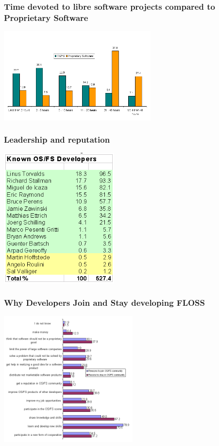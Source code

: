 \documentclass{beamer}
\begin{document}
\begin{frame}
\frametitle{Time devoted to libre software projects compared to Proprietary Software}

\begin{center}
\includegraphics[width=8cm]{figs/TimeOSvsPS.png}
\end{center}

\end{frame}


\begin{frame}
\frametitle{Leadership and reputation}

\begin{center}
\includegraphics[width=6cm]{figs/leadership.png}
\end{center}

\end{frame}


\begin{frame}
\frametitle{Why Developers Join and Stay developing FLOSS}

\begin{center}
\includegraphics[width=7cm]{figs/why.png}
\end{center}

\end{frame}
\end{document}
